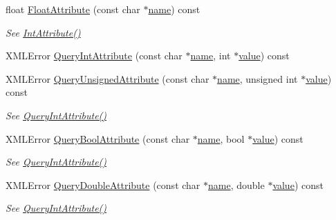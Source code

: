 \begin{DoxyCompactItemize}
float \hyperlink{classtinyxml2_1_1_x_m_l_element_a69cf755f05fc76a320eb10770845ad8f}{Float\+Attribute} (const char $\ast$\hyperlink{structname}{name}) const
\begin{DoxyCompactList}\small\item\em See \hyperlink{classtinyxml2_1_1_x_m_l_element_acfaaeeadf0b0dbe56bb0f5ec12cb7736}{Int\+Attribute()} \end{DoxyCompactList}\item 
X\+M\+L\+Error \hyperlink{classtinyxml2_1_1_x_m_l_element_a8a78bc1187c1c45ad89f2690eab567b1}{Query\+Int\+Attribute} (const char $\ast$\hyperlink{structname}{name}, int $\ast$\hyperlink{unionvalue}{value}) const
\item 
\mbox{\label{classtinyxml2_1_1_x_m_l_element_a26fc84cbfba6769dafcfbf256c05e22f}} 
X\+M\+L\+Error \hyperlink{classtinyxml2_1_1_x_m_l_element_a26fc84cbfba6769dafcfbf256c05e22f}{Query\+Unsigned\+Attribute} (const char $\ast$\hyperlink{structname}{name}, unsigned int $\ast$\hyperlink{unionvalue}{value}) const
\begin{DoxyCompactList}\small\item\em See \hyperlink{classtinyxml2_1_1_x_m_l_element_a8a78bc1187c1c45ad89f2690eab567b1}{Query\+Int\+Attribute()} \end{DoxyCompactList}\item 
\mbox{\label{classtinyxml2_1_1_x_m_l_element_a14c1bb77c39689838be01838d86ca872}} 
X\+M\+L\+Error \hyperlink{classtinyxml2_1_1_x_m_l_element_a14c1bb77c39689838be01838d86ca872}{Query\+Bool\+Attribute} (const char $\ast$\hyperlink{structname}{name}, bool $\ast$\hyperlink{unionvalue}{value}) const
\begin{DoxyCompactList}\small\item\em See \hyperlink{classtinyxml2_1_1_x_m_l_element_a8a78bc1187c1c45ad89f2690eab567b1}{Query\+Int\+Attribute()} \end{DoxyCompactList}\item 
\mbox{\label{classtinyxml2_1_1_x_m_l_element_a5f0964e2dbd8e2ee7fce9beab689443c}} 
X\+M\+L\+Error \hyperlink{classtinyxml2_1_1_x_m_l_element_a5f0964e2dbd8e2ee7fce9beab689443c}{Query\+Double\+Attribute} (const char $\ast$\hyperlink{structname}{name}, double $\ast$\hyperlink{unionvalue}{value}) const
\begin{DoxyCompactList}\small\item\em See \hyperlink{classtinyxml2_1_1_x_m_l_element_a8a78bc1187c1c45ad89f2690eab567b1}{Query\+Int\+Attribute()} \end{DoxyCompactList}\item 

\end{DoxyCompactItemize}
